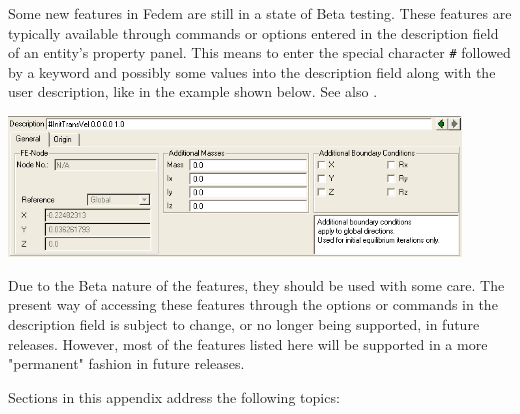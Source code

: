 %
%

%
%

\def\LinkFormatText#1{
  \medskip
  {\raggedright\tt#1}
  \medskip}

\def\LinkFormatTextNoSkip#1{{\raggedright\tt#1}}

\def\Variable#1{\textless#1\textgreater}



Some new features in Fedem are still in a state of Beta testing.
These features are typically available through commands or options
entered in the description field of an entity's property panel.
This means to enter the special character {\tt\#} followed by a keyword and
possibly some values into the description field along with the user description,
like in the example shown below. See also
.

\includegraphics[width=0.9\textwidth]{Figures/F-PropertyPanel}

Due to the Beta nature of the features, they should be used with some care.
The present way of accessing these features through the options or commands in
the description field is subject to change, or no longer being supported,
in future releases. However, most of the features listed here will be supported
in a more "permanent" fashion in future releases.

Sections in this appendix address the following topics:

